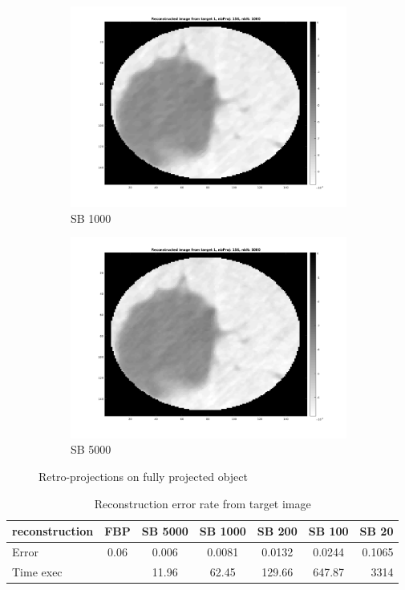\documentclass[10pt,a4paper,titlepage]{article}
\begin{document}
\begin{figure}[H]
\begin{subfigure}[b]{0.475\textwidth}
            	\includegraphics[width=\textwidth]{Sample1/fully/1000it.png}
            	\caption{SB 1000}
            	\label{subfig:1000it1Fully}
        	\end{subfigure}
        	\quad
        	\begin{subfigure}[b]{0.475\textwidth}   
        	    \centering 
        	    \includegraphics[width=\textwidth]{Sample1/fully/5000it.png}
        	    \caption{SB 5000}    
        	    \label{subfig:5000it1Fully}
       		\end{subfigure}
        	\caption{Retro-projections on fully projected object}
        	\label{fig:retFully}
    	\end{figure}

		\begin{table}[H]
			\begin{tabular}{ | l || c || c | c | c | c | r | }
 				\hline			
   				reconstruction	& FBP 	& SB 5000	& SB 1000	& SB 200	& SB 100	& SB 20 \\
   				\hline
  				Error			& 0.06	& 0.006		& 0.0081	& 0.0132	& 0.0244	& 0.1065 \\
 				\hline  
 				Time exec		&		& 11.96		& 62.45		& 129.66	& 647.87	& 3314	\\
 				\hline 
 			\end{tabular}
 			\caption{Reconstruction error rate from target image}
 			\label{tab:Error2000Sample1}
		\end{table}
\clearpage		
\end{document}
